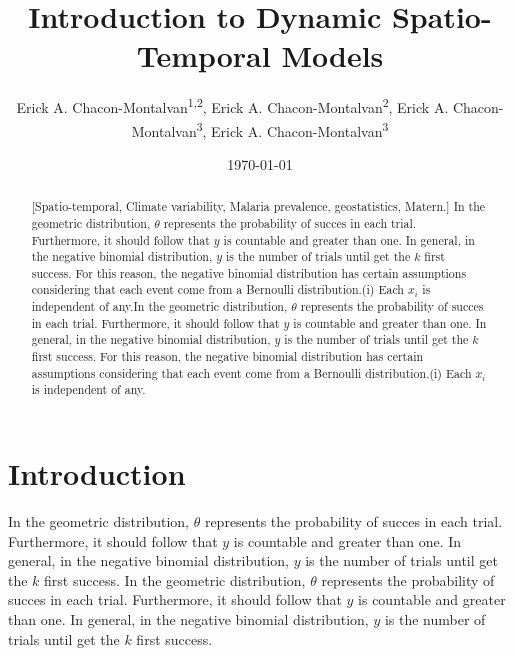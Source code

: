 \documentclass[11pt, a4paper, top=3.5cm,bottom=3.5cm, right=3cm,left=3cm]{SimpleNotes}
\title{Introduction to Dynamic Spatio-Temporal Models}
\author{Erick A. Chacon-Montalvan\textsuperscript{1,2}, Erick A. Chacon-Montalvan\textsuperscript{2}, Erick A. Chacon-Montalvan\textsuperscript{3}, Erick A. Chacon-Montalvan\textsuperscript{3}}
\institute{\textsuperscript{1}\textit{CHICAS, Medical School, Lancaster University, Lancaster, United Kingdom}\\
\textsuperscript{2}\textit{CHICAS, Medical School, Lancaster University, Lancaster, United Kingdom}
}
\date{\today}
\begin{document}
\maketitle

\begin{abstract}[Spatio-temporal, Climate variability, Malaria prevalence, geostatistics, Matern.]
In the geometric distribution, $\theta$ represents the probability of succes in each trial. Furthermore, it should follow that $y$ is countable and greater than one. In general, in the negative binomial distribution, $y$ is the number of trials until get the $k$ first success. For this reason, the negative binomial distribution has certain assumptions considering that each event come from a Bernoulli distribution.(i) Each $x_i$ is independent of any.In the geometric distribution, $\theta$ represents the probability of succes in each trial. Furthermore, it should follow that $y$ is countable and greater than one. In general, in the negative binomial distribution, $y$ is the number of trials until get the $k$ first success. For this reason, the negative binomial distribution has certain assumptions considering that each event come from a Bernoulli distribution.(i) Each $x_i$ is independent of any.
\end{abstract}

\section{Introduction}
In the geometric distribution, $\theta$ represents the probability of succes in each trial. Furthermore, it should follow that $y$ is countable and greater than one. In general, in the negative binomial distribution, $y$ is the number of trials until get the $k$ first success.
In the geometric distribution, $\theta$ represents the probability of succes in each trial. Furthermore, it should follow that $y$ is countable and greater than one. In general, in the negative binomial distribution, $y$ is the number of trials until get the $k$ first success.
\end{document}
